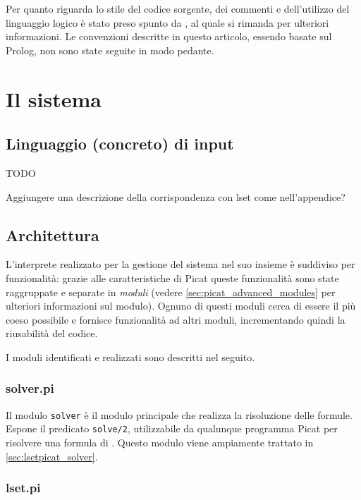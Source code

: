 \documentclass[12pt,a4paper,openright]{book} %
\begin{document}
Per quanto riguarda lo stile del codice sorgente, dei commenti e dell'utilizzo del linguaggio logico è stato preso spunto da \cite{Covington12}, al quale si rimanda per ulteriori informazioni. Le convenzioni descritte in questo articolo, essendo basate sul Prolog, non sono state seguite in modo pedante.

\section{Il sistema}
\label{sec:lsetpicat_system}

\subsection{Linguaggio (concreto) di input}

TODO

Aggiungere una descrizione della corrispondenza con lset come nell'appendice?

\subsection{Architettura}
\label{sec:lsetpicat_architecture}

L'interprete realizzato per la gestione del sistema nel suo insieme è suddiviso per funzionalità: grazie alle caratteristiche di Picat queste funzionalità sono state raggruppate e separate in \emph{moduli} (vedere \ref{sec:picat_advanced_modules} per ulteriori informazioni sul modulo). Ognuno di questi moduli cerca di essere il più coeso possibile e fornisce funzionalità ad altri moduli, incrementando quindi la riusabilità del codice.

I moduli identificati e realizzati sono descritti nel seguito.

\subsubsection{solver.pi}

Il modulo \texttt{solver} è il modulo principale che realizza la risoluzione delle formule. Espone il predicato \verb|solve/2|, utilizzabile da qualunque programma Picat per risolvere una formula di \lset{}. Questo modulo viene ampiamente trattato in \ref{sec:lsetpicat_solver}.

\subsubsection{lset.pi}
\end{document}
